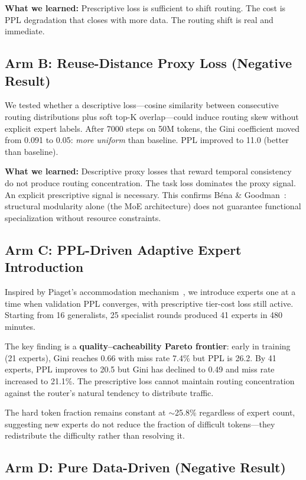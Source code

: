 \documentclass{article}
\begin{document}
\textbf{What we learned:} Prescriptive loss is sufficient to shift routing. The cost is PPL degradation that closes with more data. The routing shift is real and immediate.

\subsection{Arm B: Reuse-Distance Proxy Loss (Negative Result)}

We tested whether a descriptive loss---cosine similarity between consecutive routing distributions plus soft top-K overlap---could induce routing skew without explicit expert labels. After 7000 steps on 50M tokens, the Gini coefficient moved from 0.091 to 0.05: \emph{more uniform} than baseline. PPL improved to 11.0 (better than baseline).

\textbf{What we learned:} Descriptive proxy losses that reward temporal consistency do not produce routing concentration. The task loss dominates the proxy signal. An explicit prescriptive signal is necessary. This confirms Béna \& Goodman~\cite{bena2025modularity}: structural modularity alone (the MoE architecture) does not guarantee functional specialization without resource constraints.

\subsection{Arm C: PPL-Driven Adaptive Expert Introduction}

Inspired by Piaget's accommodation mechanism~\cite{piaget1952}, we introduce experts one at a time when validation PPL converges, with prescriptive tier-cost loss still active. Starting from 16 generalists, 25 specialist rounds produced 41 experts in 480 minutes.

The key finding is a \textbf{quality--cacheability Pareto frontier}: early in training (21 experts), Gini reaches 0.66 with miss rate 7.4\% but PPL is 26.2. By 41 experts, PPL improves to 20.5 but Gini has declined to 0.49 and miss rate increased to 21.1\%. The prescriptive loss cannot maintain routing concentration against the router's natural tendency to distribute traffic.

The hard token fraction remains constant at $\sim$25.8\% regardless of expert count, suggesting new experts do not reduce the fraction of difficult tokens---they redistribute the difficulty rather than resolving it.

\subsection{Arm D: Pure Data-Driven (Negative Result)}
\end{document}
